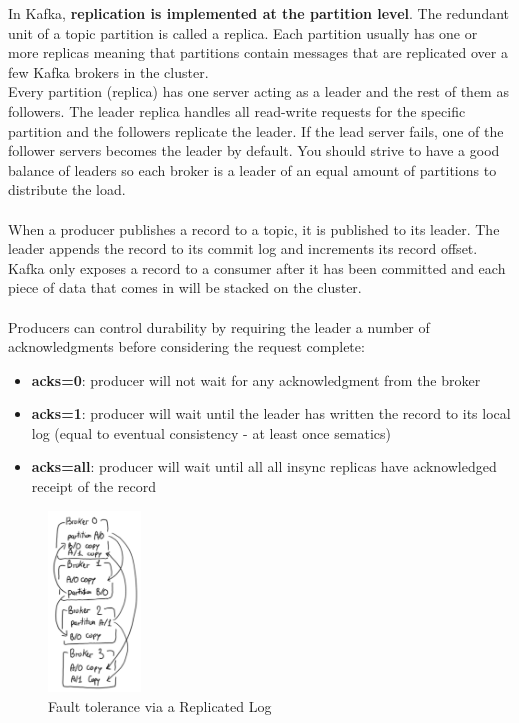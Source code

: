 \documentclass[10pt,a4paper]{article}
\newcommand{\nline}{\\~\\}
\begin{document}
In Kafka, \textbf{replication is implemented at the partition level}. The redundant unit of a topic partition is called a replica. Each partition usually has one or more replicas meaning that partitions contain messages that are replicated over a few Kafka brokers in the cluster. \\ Every partition (replica) has one server acting as a leader and the rest of them as followers. The leader replica handles all read-write requests for the specific partition and the followers replicate the leader. If the lead server fails, one of the follower servers becomes the leader by default. You should strive to have a good balance of leaders so each broker is a leader of an equal amount of partitions to distribute the load.
\nline
When a producer publishes a record to a topic, it is published to its leader. The leader appends the record to its commit log and increments its record offset. Kafka only exposes a record to a consumer after it has been committed and each piece of data that comes in will be stacked on the cluster.
\nline
Producers can control durability by requiring the leader a number of acknowledgments before considering the request complete:
\begin{itemize}
	\item \textbf{acks=0}: producer will not wait for any acknowledgment from the broker
	\item \textbf{acks=1}: producer will wait until the leader has written the record to its local log (equal to eventual consistency - at least once sematics) 
	\item \textbf{acks=all}: producer will wait until all all insync replicas have acknowledged receipt of the record
\end{itemize}

\begin{figure}[ht!]
 \hfill \includegraphics[width=70pt]{images/kafka-replication}\hspace*{\fill}
 \caption{Fault tolerance via a Replicated Log}
\end{figure} 
\end{document}
